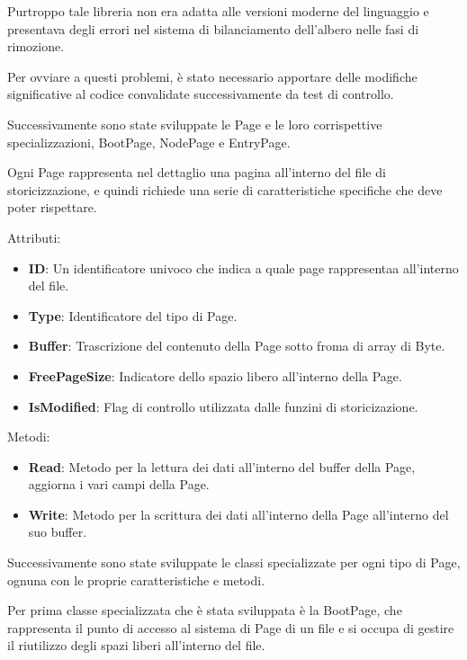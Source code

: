 \documentclass[12pt,a4paper,openright,twoside]{book}
\begin{document}
            Purtroppo tale libreria non era adatta alle versioni moderne del linguaggio e presentava degli errori nel sistema di bilanciamento dell'albero nelle fasi di rimozione.

            Per ovviare a questi problemi, è stato necessario apportare delle modifiche significative al codice convalidate successivamente da test di controllo.

            Successivamente sono state sviluppate le Page e le loro corrispettive specializzazioni, BootPage, NodePage e EntryPage.

            

            Ogni Page rappresenta nel dettaglio una pagina all'interno del file di storicizzazione, e quindi richiede una serie di caratteristiche specifiche che deve poter rispettare.

            Attributi:
            \begin{itemize}
                \item \textbf{ID}: Un identificatore univoco che indica a quale page rappresentaa all'interno del file.
                \item \textbf{Type}: Identificatore del tipo di Page.
                \item \textbf{Buffer}: Trascrizione del contenuto della Page sotto froma di array di Byte.
                \item \textbf{FreePageSize}: Indicatore dello spazio libero all'interno della Page.
                \item \textbf{IsModified}: Flag di controllo utilizzata dalle funzini di storicizazione.
            \end{itemize}

            Metodi:
            \begin{itemize}
                \item \textbf{Read}: Metodo per la lettura dei dati all'interno del buffer della Page, aggiorna i vari campi della Page.
                \item \textbf{Write}: Metodo per la scrittura dei dati all'interno della Page all'interno del suo buffer.
            \end{itemize}

            Successivamente sono state sviluppate le classi specializzate per ogni tipo di Page, ognuna con le proprie caratteristiche e metodi.

            Per prima classe specializzata che è stata sviluppata è la BootPage, che rappresenta il punto di accesso al sistema di Page di un file e si occupa di gestire il riutilizzo degli spazi liberi all'interno del file.
\end{document}
